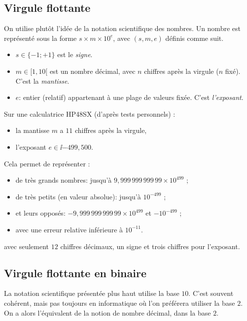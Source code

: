 \subsection{Virgule flottante}
On utilise plutôt l'idée de la notation scientifique des nombres. Un nombre est représenté sous la forme $s\times m \times 10^{e}$, avec $(s,m,e)$ définis comme suit. 
\begin{itemize} 
\item[\textbullet] $s\in\{-1;+1\}$ est le \emph{signe}.
\item[\textbullet] $m\in [1,10[$ est un nombre décimal, avec $n$ chiffres après la virgule ($n$ fixé). C'est la \emph{mantisse}.
\item[\textbullet] $e$: entier (relatif) appartenant à une plage de valeurs fixée. C'est \emph{l'exposant}.
\end{itemize}
\begin{exemple}
  Sur une  calculatrice HP48SX (d'après tests personnels) :
\begin{itemize}
\item[\textbullet] la mantisse $m$ a $11$ chiffres après la virgule,
\item[\textbullet] l'exposant $e\in \ii{-499,500}$.
\end{itemize}
Cela permet de représenter :
\begin{itemize}
\item[\textbullet] de très grands nombres: jusqu'à $9,999\,999\,999\,99\times 10^{499}$ ;
\item[\textbullet] de très petits (en valeur absolue): jusqu'à $10^{-499}$ ;
\item[\textbullet] et leurs opposés: $-9,999\,999\,999\,99\times 10^{499}$ et $-10^{-499}$ ;
\item[\textbullet] avec une erreur relative inférieure à $10^{-11}$.
\end{itemize}
avec seulement $12$ chiffres décimaux, un signe et trois chiffres pour
l'exposant. 
\end{exemple}

\subsection{Virgule flottante en binaire}

La notation scientifique présentée plus haut utilise la base $10$. 
C'est souvent cohérent, mais pas toujours en informatique où l'on préférera utiliser la base $2$.
On a alors l'équivalent de la notion de nombre décimal, dans la base $2$.

